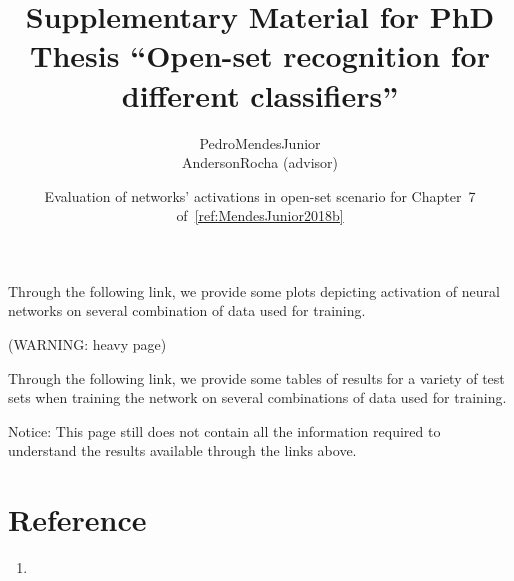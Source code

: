 

% 

\renewcommand\highlightauthorname[1]{#1}

\title{Supplementary Material for PhD Thesis ``Open-set recognition for different classifiers''}
\author{\gls{PedroMendesJunior}\\%
  \gls{AndersonRocha} (advisor)\\%
}
\date{Evaluation of networks' activations in open-set scenario for Chapter~7 of~\ref{ref:MendesJunior2018b}}



\maketitle


Through the following link, we provide some plots depicting activation of neural networks on several combination of data used for training.

\begin{center}
   (WARNING: heavy page)
\end{center}

Through the following link, we provide some tables of results for a variety of test sets when training the network on several combinations of data used for training.

\begin{center}
\end{center}

Notice: This page still does not contain all the information required to understand the results available through the links above.

\section*{Reference}

\begin{enumerate}
\item{}
\end{enumerate}




